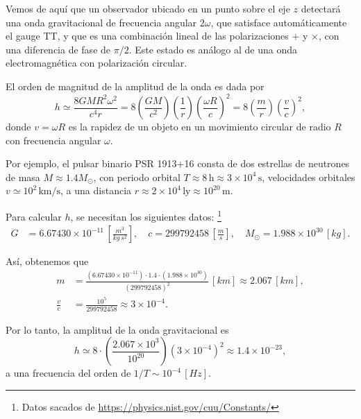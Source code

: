 \documentclass[letterpaper,11pt]{article}
\begin{document}
Vemos de aquí que un observador ubicado en un punto sobre el eje $z$ detectará una onda gravitacional de frecuencia angular $2\omega$, que satisface automáticamente el gauge TT, y que es una combinación lineal de las polarizaciones $+$ y $\times$, con una diferencia de fase de $\pi/2$. Este estado es análogo al de una onda electromagnética con polarización circular.

El orden de magnitud de la amplitud de la onda es dada por
\begin{equation}
h \simeq \frac{8GMR^2 \omega^2}{c^4 r} = 8 \left( \frac{GM}{c^2}\right) \left( \frac{1}{r}\right) \left( \frac{\omega R}{c}\right)^2 = 8 \left(\frac{m}{r} \right) \left( \frac{v}{c}\right)^2,
\end{equation}
donde $v = \omega R$ es la rapidez de un objeto en un movimiento circular de radio $R$ con frecuencia angular $\omega$.

Por ejemplo, el pulsar binario PSR 1913+16 consta de dos estrellas de neutrones de masa $M \approx 1.4 M_{\odot}$, con periodo orbital $T \approx 8 \,\text{h} \approx 3 \times 10^{4} \, \text{s}$, velocidades orbitales $v \simeq 10^2 \,\text{km/s}$, a una distancia $r \approx 2 \times 10^{4} \,\text{ly} \approx 10^{20}\, \text{m}$. 

Para calcular $h$, se necesitan los siguientes datos: \footnote{Datos sacados de \url{
https://physics.nist.gov/cuu/Constants/}}
\begin{align}
G &= 6.67430 \times 10^{-11} \,\left[ \frac{m^3}{kg \,s^2} \right], \quad  c =  299 792 458 \,\left[ \frac{m}{s}\right], \quad  M_{\odot} = 1.988 \times 10^{30} \,[kg]. 
\end{align}

Así, obtenemos que
\begin{align}
m &= \frac{(6.67430 \times 10^{-11}) \cdot 1.4 \cdot (1.988 \times 10^{30}) }{(299 792 458)^2} \,[km]\approx 2.067 \,[km], \\
\frac{v}{c} &= \frac{10^{5}}{299 792 458} \approx 3 \times 10^{-4}.
\end{align}

Por lo tanto, la amplitud de la onda gravitacional es
\begin{equation}
h \simeq 8 \cdot \left( \frac{2.067 \times 10^{3}}{10^{20}}\right) (3 \times 10^{-4})^2 \approx 1.4 \times 10^{-23},
\end{equation}
a una frecuencia del orden de $1/T \sim 10^{-4} \,[Hz]$.
\end{document}
